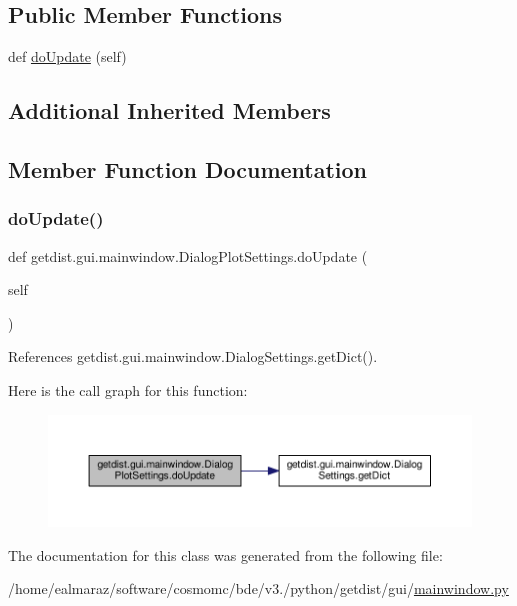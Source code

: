 \subsection*{Public Member Functions}
\begin{DoxyCompactItemize}
\item 
def \mbox{\hyperlink{classgetdist_1_1gui_1_1mainwindow_1_1DialogPlotSettings_a12ebac55892ba88f0fdf445ca5574375}{do\+Update}} (self)
\end{DoxyCompactItemize}
\subsection*{Additional Inherited Members}


\subsection{Member Function Documentation}
\mbox{\label{classgetdist_1_1gui_1_1mainwindow_1_1DialogPlotSettings_a12ebac55892ba88f0fdf445ca5574375}} 
\subsubsection{\texorpdfstring{do\+Update()}{doUpdate()}}
{\footnotesize\ttfamily def getdist.\+gui.\+mainwindow.\+Dialog\+Plot\+Settings.\+do\+Update (\begin{DoxyParamCaption}\item[{}]{self }\end{DoxyParamCaption})}



References getdist.\+gui.\+mainwindow.\+Dialog\+Settings.\+get\+Dict().

Here is the call graph for this function\+:
\nopagebreak
\begin{figure}[H]
\begin{center}
\leavevmode
\includegraphics[width=350pt]{classgetdist_1_1gui_1_1mainwindow_1_1DialogPlotSettings_a12ebac55892ba88f0fdf445ca5574375_cgraph}
\end{center}
\end{figure}


The documentation for this class was generated from the following file\+:\begin{DoxyCompactItemize}
\item 
/home/ealmaraz/software/cosmomc/bde/v3./python/getdist/gui/\mbox{\hyperlink{mainwindow_8py}{mainwindow.\+py}}\end{DoxyCompactItemize}
